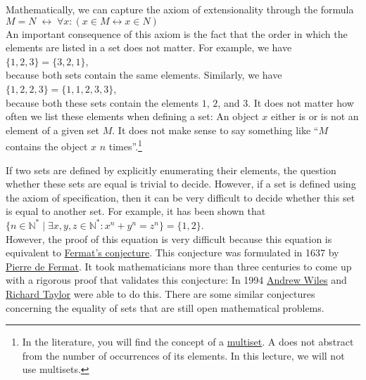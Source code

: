\noindent
Mathematically, we can capture the axiom of extensionality through the formula
\\[0.2cm]
\hspace*{1.3cm} $M = N \;\leftrightarrow\; \forall x: (x \in M \leftrightarrow x \in N)$ 
\\[0.2cm]
An important consequence of this axiom is the fact that the order in which the
elements are listed in a set does not matter.  For example, we have 
\\[0.2cm] 
\hspace*{1.3cm} $\{1,2,3\} = \{3,2,1\}$, 
\\[0.2cm]
because both sets contain the same elements.  Similarly, we have
\\[0.2cm]
\hspace*{1.3cm}
$\{1,2,2,3\} = \{1,1,2,3,3\}$,
\\[0.2cm]
because both these sets contain the elements $1$, $2$, and $3$.  It does not matter how often we list these
elements when defining a set:  An object $x$ either is or is not an element of a given set $M$.  It does not
make sense to say something like ``$M$ contains the object $x$ $n$ times''.\footnote{In the literature, you will find
the concept of a \href{https://en.wikipedia.org/wiki/Multiset}{multiset}.  A  does not abstract
from the number of occurrences of its elements.  In this lecture, we will not use multisets.}

If two sets are defined by explicitly enumerating their elements, the question whether
these sets are equal is trivial to decide.  However, if a set is defined using the axiom of specification, then
it can be very difficult to decide whether this set is equal to another set.  For 
example, it has been shown that \\[0.2cm]
\hspace*{1.3cm} 
$\{ n \in \mathbb{N}^* \mid \exists x, y, z\in\mathbb{N}^*: x^n + y^n = z^n \} = \{1, 2\}$. 
\\[0.2cm]
However, the proof of this equation is very difficult because this equation
is equivalent to \href{https://en.wikipedia.org/wiki/Fermat%27s_Last_Theorem}{Fermat's conjecture}. 
This conjecture was formulated in 1637 by \href{https://de.wikipedia.org/wiki/Pierre_de_Fermat}{Pierre de Fermat}.  
It took mathematicians more than three centuries to come up with a rigorous proof that validates this conjecture:
In 1994 \href{https://de.wikipedia.org/wiki/Andrew_Wiles}{Andrew Wiles}
and \href{https://de.wikipedia.org/wiki/Richard_Taylor_(Mathematician)}{Richard Taylor} were able to do this.
There are some similar conjectures concerning the equality of sets that are still open mathematical problems. 


